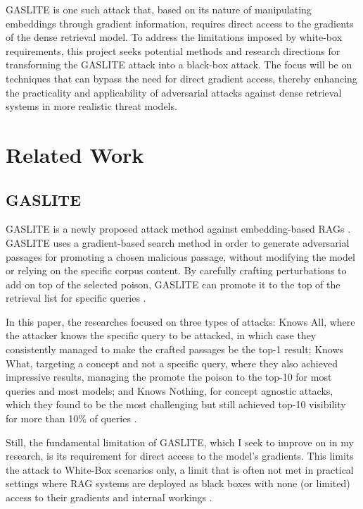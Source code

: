 \documentclass[a4paper, sigconf]{acmart}
\begin{document}
GASLITE is one such attack that, based on its nature of manipulating embeddings through gradient information, requires direct access to the gradients of the dense retrieval model. To address the limitations imposed by white-box requirements, this project seeks potential methods and research directions for transforming the GASLITE attack into a black-box attack. The focus will be on techniques that can bypass the need for direct gradient access, thereby enhancing the practicality and applicability of adversarial attacks against dense retrieval systems in more realistic threat models.


\section{Related Work}

\subsection{GASLITE}

GASLITE is a newly proposed attack method against embedding-based RAGs \cite{bentov2024}. 
GASLITE uses a gradient-based search method in order to generate adversarial passages for promoting a chosen malicious passage, without modifying the model or relying on the specific corpus content. 
By carefully crafting perturbations to add on top of the selected poison, GASLITE can promote it to the top of the retrieval list for specific queries \cite{bentov2024}.

In this paper, the researches focused on three types of attacks: Knows All, where the attacker knows the specific query to be attacked, in which case they consistently managed to make the crafted passages be the top-1 result; Knows What, targeting a concept and not a specific query, where they also achieved impressive results, managing the promote the poison to the top-10 for most queries and most models; and Knows Nothing, for concept agnostic attacks, which they found to be the most challenging but still achieved top-10 visibility for more than 10\% of queries \cite{bentov2024}.
 
Still, the fundamental limitation of GASLITE, which I seek to improve on in my research, is its requirement for direct access to the model's gradients. This limits the attack to White-Box scenarios only, a limit that is often not met in practical settings where RAG systems are deployed as black boxes with none (or limited) access to their gradients and internal workings \cite{bentov2024}. 
\end{document}
